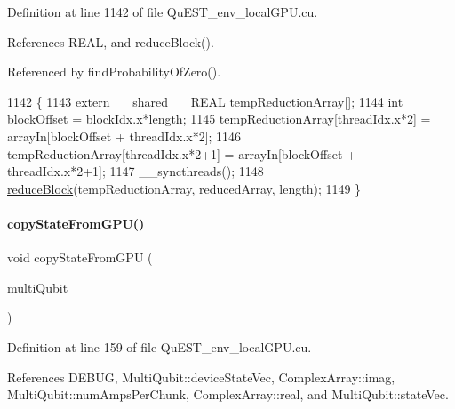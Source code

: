 Definition at line 1142 of file Qu\+E\+S\+T\+\_\+env\+\_\+local\+G\+P\+U.\+cu.



References R\+E\+AL, and reduce\+Block().



Referenced by find\+Probability\+Of\+Zero().


\begin{DoxyCode}
1142                                                                                    \{
1143     \textcolor{keyword}{extern} \_\_shared\_\_ \mbox{\hyperlink{QuEST__precision_8h_a4b654506f18b8bfd61ad2a29a7e38c25}{REAL}} tempReductionArray[];
1144     \textcolor{keywordtype}{int} blockOffset = blockIdx.x*length;
1145     tempReductionArray[threadIdx.x*2] = arrayIn[blockOffset + threadIdx.x*2];
1146     tempReductionArray[threadIdx.x*2+1] = arrayIn[blockOffset + threadIdx.x*2+1];
1147     \_\_syncthreads();
1148     \mbox{\hyperlink{QuEST__env__localGPU_8cu_a4c740fa3ae25c71c1736790c674bdc98}{reduceBlock}}(tempReductionArray, reducedArray, length);
1149 \}
\end{DoxyCode}
\mbox{\label{QuEST__env__localGPU_8cu_a0d255fec1e375244d4cb980fac92621d}} 
\paragraph{\texorpdfstring{copy\+State\+From\+G\+P\+U()}{copyStateFromGPU()}}
{\footnotesize\ttfamily void copy\+State\+From\+G\+PU (\begin{DoxyParamCaption}\item[{\mbox{\hyperlink{structMultiQubit}{Multi\+Qubit}}}]{multi\+Qubit }\end{DoxyParamCaption})}



Definition at line 159 of file Qu\+E\+S\+T\+\_\+env\+\_\+local\+G\+P\+U.\+cu.



References D\+E\+B\+UG, Multi\+Qubit\+::device\+State\+Vec, Complex\+Array\+::imag, Multi\+Qubit\+::num\+Amps\+Per\+Chunk, Complex\+Array\+::real, and Multi\+Qubit\+::state\+Vec.



